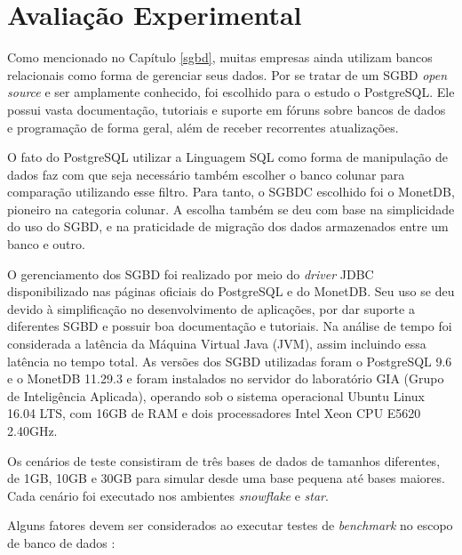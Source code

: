 \graphicspath{ {6-Experimento/} }

\chapter{Avaliação Experimental}

Como mencionado no Capítulo \ref{sgbd}, muitas empresas ainda utilizam 
bancos relacionais como forma de gerenciar seus dados. 
Por se tratar de um SGBD \textit{open source} e ser amplamente 
conhecido, foi escolhido para o estudo o PostgreSQL. Ele possui vasta 
documentação, tutoriais e suporte em fóruns sobre bancos de dados e 
programação de forma geral, além de receber recorrentes atualizações. 

O fato do PostgreSQL utilizar a Linguagem SQL como forma de 
manipulação de dados faz com que seja necessário também escolher 
o banco colunar para comparação utilizando esse filtro. Para tanto, o 
SGBDC escolhido foi o MonetDB, pioneiro na categoria colunar. A escolha também 
se deu com base na simplicidade do uso do SGBD, e na praticidade de 
migração dos dados armazenados entre um banco e outro. 

O gerenciamento dos SGBD foi realizado por meio do \textit{driver} JDBC 
disponibilizado nas páginas oficiais do PostgreSQL e do MonetDB. Seu uso se deu 
devido à simplificação no desenvolvimento de aplicações, por dar suporte a 
diferentes SGBD e possuir boa documentação e tutoriais. Na análise de tempo 
foi considerada a latência da Máquina Virtual Java (JVM), assim incluindo essa 
latência no tempo total. As versões dos SGBD utilizadas 
foram o PostgreSQL 9.6 e o MonetDB 11.29.3 e foram instalados no servidor do laboratório GIA (Grupo de Inteligência Aplicada), operando sob o 
sistema operacional Ubuntu Linux 16.04 LTS, com 16GB de RAM e dois 
processadores Intel Xeon CPU E5620 2.40GHz.

Os cenários de teste consistiram de três bases de dados de tamanhos 
diferentes, de 1GB, 10GB e 30GB para simular desde uma base pequena 
até bases maiores. Cada cenário foi executado nos ambientes \textit{snowflake} e 
\textit{star}.

Alguns fatores devem ser considerados ao executar testes de \textit{benchmark} 
no escopo de banco de dados \cite{raasveldt2018fair}:

